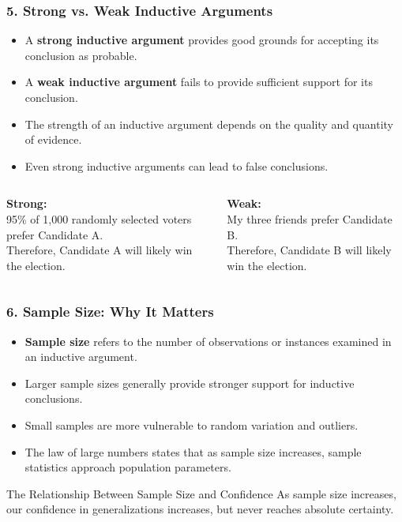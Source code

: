 \documentclass{beamer}
\begin{document}
\begin{frame}
\frametitle{5. Strong vs. Weak Inductive Arguments}
\begin{itemize}
\item A \textbf{strong inductive argument} provides good grounds for accepting its conclusion as probable.
\item A \textbf{weak inductive argument} fails to provide sufficient support for its conclusion.
\item The strength of an inductive argument depends on the quality and quantity of evidence.
\item Even strong inductive arguments can lead to false conclusions.
\end{itemize}

\begin{columns}
\textbf{Strong:}\\
95\% of 1,000 randomly selected voters prefer Candidate A.\\
Therefore, Candidate A will likely win the election.

\textbf{Weak:}\\
My three friends prefer Candidate B.\\
Therefore, Candidate B will likely win the election.
\end{columns}
\end{frame}

\begin{frame}
\frametitle{6. Sample Size: Why It Matters}
\begin{itemize}
\item \textbf{Sample size} refers to the number of observations or instances examined in an inductive argument.
\item Larger sample sizes generally provide stronger support for inductive conclusions.
\item Small samples are more vulnerable to random variation and outliers.
\item The law of large numbers states that as sample size increases, sample statistics approach population parameters.
\end{itemize}

\begin{block}{The Relationship Between Sample Size and Confidence}
As sample size increases, our confidence in generalizations increases, but never reaches absolute certainty.
\end{block}
\end{frame}
\end{document}
